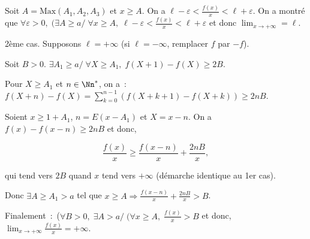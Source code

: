 {{Soit $A=\mbox{Max}(A_1,A_2,A_3)$ et $x\geq A$. On a $\ell-\varepsilon<\frac{f(x)}{x}<\ell+\varepsilon$. On a montré que $\forall\varepsilon>0,\;(\exists A\geq a/\;\forall x\geq A,\;\ell-\varepsilon<\frac{f(x)}{x}<\ell+\varepsilon$ et donc $\lim_{x\rightarrow +\infty}=\ell$.

2ème cas. Supposons $\ell=+\infty$ (si $\ell=-\infty$, remplacer $f$ par $-f$).

Soit $B>0$. $\exists A_1\geq a/\;\forall X\geq A_1,\;f(X+1)-f(X)\geq 2B$.

Pour $X\geq A_1$ et $n\in\Nn^*$, on a~:~$f(X+n)-f(X)=\sum_{k=0}^{n-1}(f(X+k+1)-f(X+k))\geq2nB$.

Soient $x\geq1+A_1$, $n=E(x-A_1)$ et $X=x-n$. On a $f(x)-f(x-n)\geq2nB$ et donc,

$$\frac{f(x)}{x}\geq\frac{f(x-n)}{x}+\frac{2nB}{x},$$

qui tend vers $2B$ quand $x$ tend vers $+\infty$ (démarche identique au 1er cas).

Donc $\exists A\geq A_1>a$ tel que $x\geq A\Rightarrow\frac{f(x-n)}{x}+\frac{2nB}{x}>B$.

Finalement~:~($\forall B>0,\;\exists A>a/\;(\forall x\geq A,\;\frac{f(x)}{x}>B$ et donc, $\lim_{x\rightarrow +\infty}\frac{f(x)}{x}=+\infty$.}
}